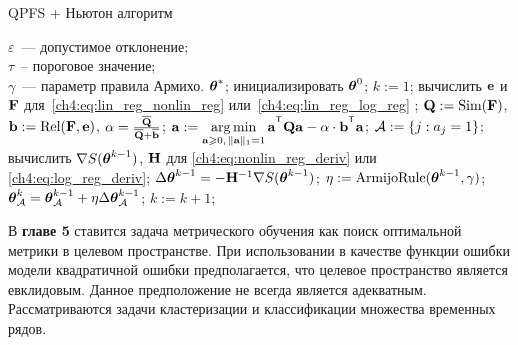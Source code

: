 \documentclass[11pt, a5paper]{dissert}
\begin{document}
\begin{algorithm}[ht]
	\caption{QPFS + Ньютон алгоритм}
	\label{ch4:alg:QPFSNewton}
	\begin{algorithmic}
		\REQUIRE $\varepsilon$~--- допустимое отклонение;\\
		\hspace{1.07cm}$\tau$~-- пороговое значение;\\
		\hspace{1.07cm}$\gamma$~--- параметр правила Армихо.
		\ENSURE $\boldsymbol{\theta}^*$;
		\STATE  инициализировать $\boldsymbol{\theta}^0$;
		\STATE $k := 1$;
		\REPEAT
		\STATE вычислить $\mathbf{e}$ и $\mathbf{F}$ для~\eqref{ch4:eq:lin_reg_nonlin_reg} или~\eqref{ch4:eq:lin_reg_log_reg} ;
		\vspace{0.1cm}
		\STATE $\mathbf{Q} := \text{Sim} (\mathbf{F})$, $\mathbf{b} := \text{Rel}(\mathbf{F}, \mathbf{e})$, $\alpha = \frac{\overline{\mathbf{Q}}}{\overline{\mathbf{Q}} + \overline{\mathbf{b}}}$;
		\vspace{0.1cm}
		\STATE $\ba := \argmin_{\ba \geq 0, \, \|\ba\|_1=1}\ba^{\T} \bQ \ba - \alpha \cdot \mathbf{b}^{\T} \ba$;
		\vspace{0.1cm}
		\STATE $\mathcal{A} := \{j: a_j = 1\}$;
		\vspace{0.1cm}
		\STATE вычислить $\nabla S(\boldsymbol{\theta}^{k-1})$, $\mathbf{H}$ для \eqref{ch4:eq:nonlin_reg_deriv} или \eqref{ch4:eq:log_reg_deriv};
		\vspace{0.1cm}
		\STATE $\Delta \boldsymbol{\theta}^{k-1} = - \mathbf{H}^{-1} \nabla S(\boldsymbol{\theta}^{k-1})$;
		\vspace{0.1cm}
		\STATE $\eta := \text{ArmijoRule}(\boldsymbol{\theta}^{k-1}, \gamma)$;
		\vspace{0.1cm}
		\STATE $\boldsymbol{\theta}_{\mathcal{A}}^k = \boldsymbol{\theta}_{\mathcal{A}}^{k - 1} + \eta \Delta \boldsymbol{\theta}_{\mathcal{A}}^{k - 1}$;
		\vspace{0.1cm}
		\STATE $k := k + 1$;
		\vspace{0.1cm}
	\end{algorithmic}
\end{algorithm}

В \textbf{главе 5} ставится задача метрического обучения как поиск оптимальной метрики в целевом пространстве.
При использовании в качестве функции ошибки модели квадратичной ошибки предполагается, что целевое пространство является евклидовым. 
Данное предположение не всегда является адекватным.
Рассматриваются задачи кластеризации и классификации множества временных рядов.
\end{document}
